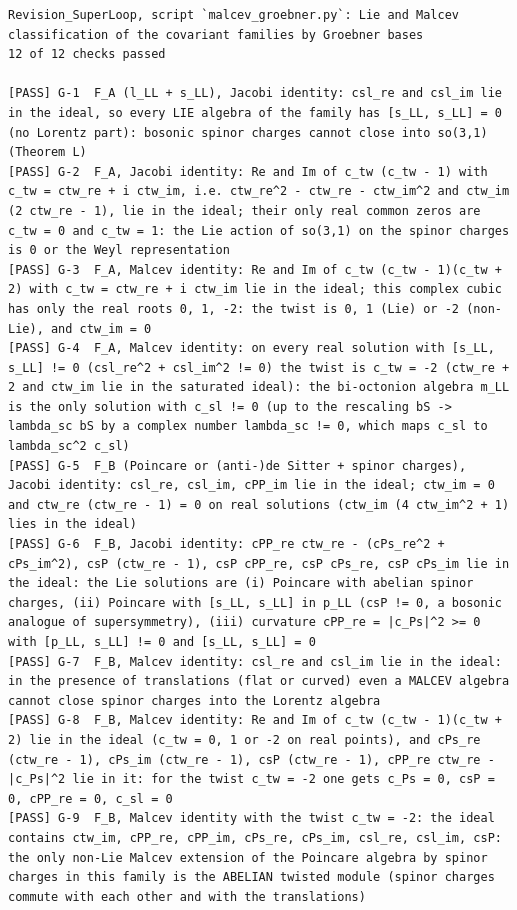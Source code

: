 \documentclass[
  10pt,
]{article}
\begin{document}
\begin{verbatim}
Revision_SuperLoop, script `malcev_groebner.py`: Lie and Malcev classification of the covariant families by Groebner bases
12 of 12 checks passed

[PASS] G-1  F_A (l_LL + s_LL), Jacobi identity: csl_re and csl_im lie in the ideal, so every LIE algebra of the family has [s_LL, s_LL] = 0 (no Lorentz part): bosonic spinor charges cannot close into so(3,1) (Theorem L)
[PASS] G-2  F_A, Jacobi identity: Re and Im of c_tw (c_tw - 1) with c_tw = ctw_re + i ctw_im, i.e. ctw_re^2 - ctw_re - ctw_im^2 and ctw_im (2 ctw_re - 1), lie in the ideal; their only real common zeros are c_tw = 0 and c_tw = 1: the Lie action of so(3,1) on the spinor charges is 0 or the Weyl representation
[PASS] G-3  F_A, Malcev identity: Re and Im of c_tw (c_tw - 1)(c_tw + 2) with c_tw = ctw_re + i ctw_im lie in the ideal; this complex cubic has only the real roots 0, 1, -2: the twist is 0, 1 (Lie) or -2 (non-Lie), and ctw_im = 0
[PASS] G-4  F_A, Malcev identity: on every real solution with [s_LL, s_LL] != 0 (csl_re^2 + csl_im^2 != 0) the twist is c_tw = -2 (ctw_re + 2 and ctw_im lie in the saturated ideal): the bi-octonion algebra m_LL is the only solution with c_sl != 0 (up to the rescaling bS -> lambda_sc bS by a complex number lambda_sc != 0, which maps c_sl to lambda_sc^2 c_sl)
[PASS] G-5  F_B (Poincare or (anti-)de Sitter + spinor charges), Jacobi identity: csl_re, csl_im, cPP_im lie in the ideal; ctw_im = 0 and ctw_re (ctw_re - 1) = 0 on real solutions (ctw_im (4 ctw_im^2 + 1) lies in the ideal)
[PASS] G-6  F_B, Jacobi identity: cPP_re ctw_re - (cPs_re^2 + cPs_im^2), csP (ctw_re - 1), csP cPP_re, csP cPs_re, csP cPs_im lie in the ideal: the Lie solutions are (i) Poincare with abelian spinor charges, (ii) Poincare with [s_LL, s_LL] in p_LL (csP != 0, a bosonic analogue of supersymmetry), (iii) curvature cPP_re = |c_Ps|^2 >= 0 with [p_LL, s_LL] != 0 and [s_LL, s_LL] = 0
[PASS] G-7  F_B, Malcev identity: csl_re and csl_im lie in the ideal: in the presence of translations (flat or curved) even a MALCEV algebra cannot close spinor charges into the Lorentz algebra
[PASS] G-8  F_B, Malcev identity: Re and Im of c_tw (c_tw - 1)(c_tw + 2) lie in the ideal (c_tw = 0, 1 or -2 on real points), and cPs_re (ctw_re - 1), cPs_im (ctw_re - 1), csP (ctw_re - 1), cPP_re ctw_re - |c_Ps|^2 lie in it: for the twist c_tw = -2 one gets c_Ps = 0, csP = 0, cPP_re = 0, c_sl = 0
[PASS] G-9  F_B, Malcev identity with the twist c_tw = -2: the ideal contains ctw_im, cPP_re, cPP_im, cPs_re, cPs_im, csl_re, csl_im, csP: the only non-Lie Malcev extension of the Poincare algebra by spinor charges in this family is the ABELIAN twisted module (spinor charges commute with each other and with the translations)

\end{verbatim}
\end{document}
